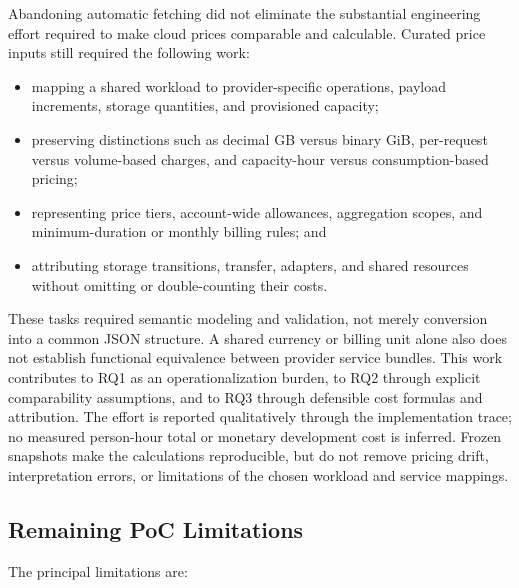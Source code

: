 Abandoning automatic fetching did not eliminate the substantial engineering
effort required to make cloud prices comparable and calculable. Curated price
inputs still required the following work:

\begin{itemize}
    \item mapping a shared workload to provider-specific operations, payload
    increments, storage quantities, and provisioned capacity;
    \item preserving distinctions such as decimal GB versus binary GiB,
    per-request versus volume-based charges, and capacity-hour versus
    consumption-based pricing;
    \item representing price tiers, account-wide allowances, aggregation
    scopes, and minimum-duration or monthly billing rules; and
    \item attributing storage transitions, transfer, adapters, and shared
    resources without omitting or double-counting their costs.
\end{itemize}

These tasks required semantic modeling and validation, not merely conversion
into a common JSON structure. A shared currency or billing unit alone also
does not establish functional equivalence between provider service bundles.
This work contributes to RQ1 as an operationalization burden, to RQ2 through
explicit comparability assumptions, and to RQ3 through defensible cost
formulas and attribution. The effort is reported qualitatively through the
implementation trace; no measured person-hour total or monetary development
cost is inferred. Frozen snapshots make the calculations reproducible, but
do not remove pricing drift, interpretation errors, or limitations of the
chosen workload and service mappings.

\subsection{Remaining PoC Limitations}

The principal limitations are:

